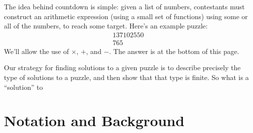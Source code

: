 The idea behind countdown is simple: given a list of numbers, contestants must
construct an arithmetic expression (using a small set of functions) using some
or all of the numbers, to reach some target.
Here's an example puzzle:
\begin{gather*}
  \boxed{1} \boxed{3} \boxed{7} \boxed{10} \boxed{25} \boxed{50} \\
  \boxed{765} \tag{Target}
\end{gather*}
We'll allow the use of \(\times\), \(+\), and \(-\).
The answer is at the bottom of this page\footnotemark.


Our strategy for finding solutions to a given puzzle is to describe precisely
the type of solutions to a puzzle, and then show that that type is finite.
So what is a ``solution'' to 

\section{Notation and Background}
